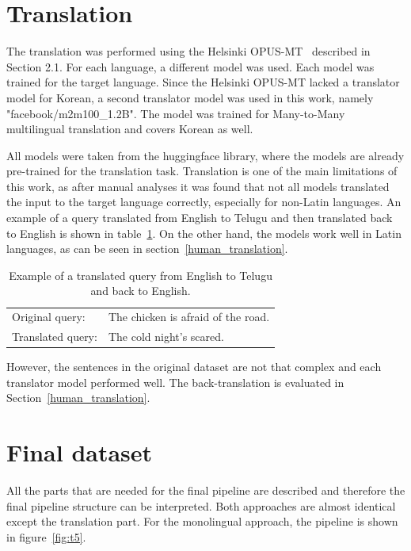 \section{Translation}
The translation was performed using the Helsinki OPUS-MT~\cite{helsinki} described in Section 2.1. For each language, a different model was used. Each model was trained for the target language. Since the Helsinki OPUS-MT lacked a translator model for Korean, a second translator model was used in this work, namely "facebook/m2m100\_1.2B". The model was trained for Many-to-Many multilingual translation and covers Korean as well.

All models were taken from the huggingface library, where the models are already pre-trained for the translation task. Translation is one of the main limitations of this work, as after manual analyses it was found that not all models translated the input to the target language correctly, especially for non-Latin languages. An example of a query translated from English to Telugu and then translated back to English is shown in table~\ref{tab:translation}. On the other hand, the models work well in Latin languages, as can be seen in section~\ref{human_translation}. 

\begin{table}[h]
    \centering
    \begin{tabular}{lp{7cm}}
        \hline
        Original query: & The chicken is afraid of the road. \\
        Translated query: & The cold night's scared.\\
        \hline
    \end{tabular}
    \caption{Example of a translated query from English to Telugu and back to English.}
    \label{tab:translation}
\end{table}

However, the sentences in the original dataset are not that complex and each translator model performed well. The back-translation is evaluated in Section~\ref{human_translation}.

\section{Final dataset}
All the parts that are needed for the final pipeline are described and therefore the final pipeline structure can be interpreted. Both approaches are almost identical except the translation part. For the monolingual approach, the pipeline is shown in figure~\ref{fig:t5}.

